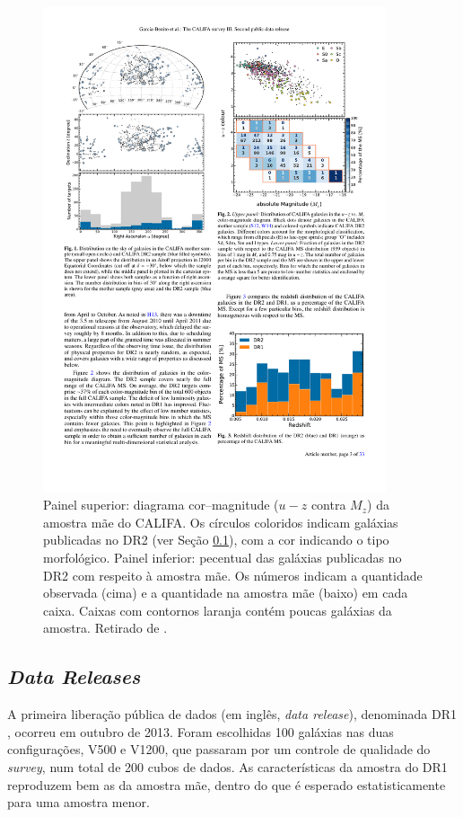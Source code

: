 \begin{figure}
	\includegraphics[width=0.9\textwidth]{figuras/CALIFACMD}
	\caption[Diagrama cor--magnitude da amostra mãe do CALIFA]
	{Painel superior: diagrama cor--magnitude ($u-z$ contra $M_z$) da amostra mãe
	do CALIFA. Os círculos coloridos indicam galáxias publicadas no DR2 (ver Seção
	\ref{sec:ifs:dr}), com a cor indicando o tipo morfológico. Painel inferior:
	pecentual das galáxias publicadas no DR2 com respeito à amostra mãe. Os números
	indicam a quantidade observada (cima) e a quantidade na amostra mãe (baixo) em
	cada caixa. Caixas com contornos laranja contém poucas galáxias da
	amostra. Retirado de
	\citet{GarciaBenito2015}.}
	\label{fig:CALIFACMD}
\end{figure}


\subsection{{\em Data Releases}}
\label{sec:ifs:dr}

A primeira liberação pública de dados (em inglês, {\em data release}),
denominada DR1 \citep{Husemann2013}, ocorreu em outubro de 2013. Foram
escolhidas 100 galáxias nas duas configurações, V500 e V1200, que passaram por
um controle de qualidade do {\em survey}, num total de 200 cubos de dados. As
características da amostra do DR1 reproduzem bem as da amostra mãe, dentro do
que é esperado estatisticamente para uma amostra menor.

